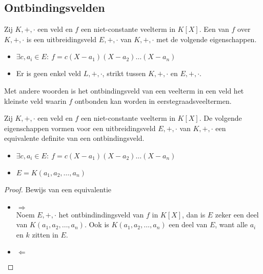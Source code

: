 \documentclass[main.tex]{subfiles}
\begin{document}
\subsection{Ontbindingsvelden}
\label{sec:ontbindingsvelden}

\begin{de}
  Zij $K,+,\cdot$ een veld en $f$ een niet-constante veelterm in $K[X]$.
  Een  van $f$ over $K,+,\cdot$ is een uitbreidingsveld $E,+,\cdot$ van $K,+,\cdot$ met de volgende eigenschappen.
  \begin{itemize}
  \item $\exists c, a_{i} \in E:\ f = c(X-a_{1})(X-a_{2})\dotsc(X-a_{n})$
  \item Er is geen enkel veld $L,+,\cdot$, strikt tussen $K,+,\cdot$ en $E,+,\cdot$.
  \end{itemize}
  Met andere woorden is het ontbindingsveld van een veelterm in een veld het kleinste veld waarin $f$ ontbonden kan worden in eerstegraadsveeltermen.
\end{de}

\begin{st}
  Zij $K,+,\cdot$ een veld en $f$ een niet-constante veelterm in $K[X]$.
  De volgende eigenschappen vormen voor een uitbreidingsveld $E,+,\cdot$ van $K,+,\cdot$ een equivalente definite van een ontbindingsveld.
  \begin{itemize}
  \item $\exists c, a_{i} \in E:\ f = c(X-a_{1})(X-a_{2})\dotsc(X-a_{n})$
  \item $E = K(a_{1},a_{2},\dotsc,a_{n})$
  \end{itemize} 

  \begin{proof}
    Bewijs van een equivalentie
    \begin{itemize}
    \item $\Rightarrow$\\
      Noem $E,+,\cdot$ het ontbindindingsveld van $f$ in $K[X]$, dan is $E$ zeker een deel van $ K(a_{1},a_{2},\dotsc,a_{n})$.\waarom
      Ook is $K(a_{1},a_{2},\dotsc,a_{n})$ een deel van $E$, want alle $a_{i}$ en $k$ zitten in $E$.
      \waarom
    \item $\Leftarrow$\\
    \end{itemize}
  \end{proof}
\end{st}
\end{document}
